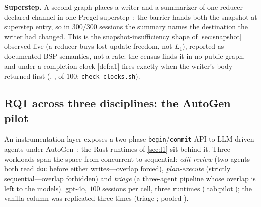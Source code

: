 \smallskip\noindent\textbf{Superstep.} A second graph places a writer and a
summarizer of one reducer-declared channel in one Pregel
superstep~\cite{MalewiczEtAl2010Pregel}; the barrier hands both the snapshot
at superstep entry, so in $300/300$ sessions the summary names the
destination the writer had changed. This is the snapshot-insufficiency shape
of \cref{sec:snapshot} observed live (a reducer buys lost-update freedom,
not $L_1$), reported as documented BSP semantics, not a rate: the census
finds it in no public graph, and under a completion clock \cref{def:a1}
fires exactly when the writer's body returned first (\SuperstepGpt,
\SuperstepHaiku, \SuperstepLlama{} of $100$; \texttt{check\_clocks.sh}).


\subsection{RQ1 across three disciplines: the AutoGen pilot}
\label{sec:pilot}
An instrumentation layer exposes a two-phase \texttt{begin}/\texttt{commit}
API to LLM-driven agents under AutoGen~\cite{WuEtAl2023AutoGen}; the Rust
runtimes of \cref{sec:l1} sit behind it. Three workloads span the space from
concurrent to sequential: \emph{edit-review} (two agents both read
\texttt{doc} before either writes---overlap forced), \emph{plan-execute}
(strictly sequential---overlap forbidden) and \emph{triage} (a three-agent
pipeline whose overlap is left to the models). gpt-4o, $100$ sessions per
cell, three runtimes (\cref{tab:pilot}); the vanilla column was replicated
three times (triage \PilotTriageRates; pooled \PilotTriagePooled).

\begin{table}[t]
\centering
\caption{AutoGen pilot,  firing rate by runtime and workload (run
\texttt{\CostRun}, $n{=}100$ per cell). \emph{Complete \& clean}: sessions
with no  witness in which every role that commits in the unguarded cell
also commits here.}
\label{tab:pilot}
\footnotesize
\setlength{\tabcolsep}{3pt}
\end{table}


